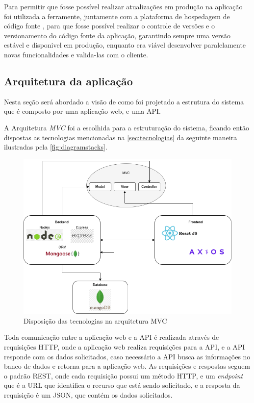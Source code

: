 Para permitir que fosse possível realizar atualizações em produção na aplicação foi utilizada a ferramente\cite{git}, juntamente com a plataforma de hospedagem de código fonte \cite{github}, para que fosse possível realizar o controle de versões e o versionamento do código fonte da aplicação, garantindo sempre uma versão estável e disponivel em produção, enquanto era viável desenvolver paralelamente novas funcionalidades e valida-las com o cliente.

\subsection{Arquitetura da aplicação}
Nesta seção será abordado a visão de como foi projetado a estrutura do sistema que é composto por uma aplicação web, e uma API.

A Arquitetura \textit{MVC} foi a escolhida para a estruturação do sistema, ficando então dispostas as tecnologias mencionadas na \autoref{sec:tecnologias} da seguinte maneira ilustradas pela  \autoref{fig:diagramstacks}.

\begin{figure}[htb]
    \caption{\label{fig:diagramstacks}Disposição das tecnologias na arquitetura MVC}
    \begin{center}
        \includegraphics[scale=0.5]{imagens/diagrama.png}
    \end{center}
\end{figure}


Toda comunicação entre a aplicação web e a API é realizada através de requisições HTTP, onde a aplicação web realiza requisições para a API, e a API responde com os dados solicitados, caso necessário a API busca as informações no banco de dados e retorna para a aplicação web.
As requisições e respostas seguem o padrão REST, onde cada requisição possui um método HTTP, e um \textit{endpoint} que é a URL que identifica o recurso que está sendo solicitado, e a resposta da requisição é um JSON, que contém os dados solicitados.



